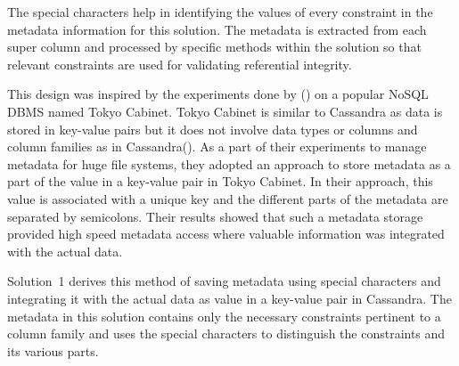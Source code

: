 		
The special characters help in identifying the values of every constraint in the
metadata information for this solution.  The metadata is extracted from each
super column and processed by specific methods within the solution so that
relevant constraints are used for validating referential integrity.  


This design was inspired by the experiments done by () on a popular \ac{NoSQL} \ac{DBMS} named Tokyo Cabinet.  Tokyo Cabinet
is similar to Cassandra as data is stored in key-value pairs but it does not involve data
types or columns and column families as in Cassandra(). 
As a part of their experiments to manage metadata for huge file systems,  they
adopted an approach to store metadata  as a part of the value in a
key-value pair in Tokyo Cabinet.  In their approach, this value  is associated
with a unique key and the different parts of the metadata are separated by
semicolons.
Their results showed that such a metadata
storage provided high speed metadata access where valuable information was 
integrated with the actual data.  

Solution~1 derives this method of saving
metadata using special characters and integrating it with the actual data as
value in a key-value pair in Cassandra.  The metadata in this solution 
contains only the necessary constraints pertinent to a column family and uses
the special characters to distinguish the constraints and its various parts. 













